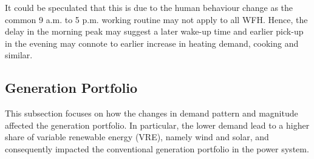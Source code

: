 \documentclass[energies,article,submit,moreauthors,pdftex]{Definitions/mdpi}
\begin{document}
It could be speculated that this is due to the human behaviour change as the common 9 a.m. to 5 p.m. working routine may not apply to all WFH. Hence, the delay in the morning peak may suggest a later wake-up time and earlier pick-up in the evening may connote to earlier increase in heating demand, cooking and similar.








\subsection{Generation Portfolio}\label{sec:Generation portfolio}
This subsection focuses on how the changes in demand pattern and magnitude affected the generation portfolio. In particular, the lower demand lead to a higher share of variable renewable energy (VRE), namely wind and solar, and consequently impacted the conventional generation portfolio in the power system. 
\end{document}
